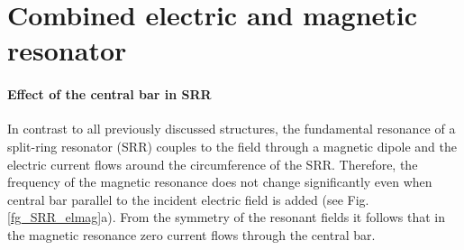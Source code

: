 \section{Combined electric and magnetic resonator} \label{section_emsrr} %
\paragraph{Effect of the central bar in SRR}%
In contrast to all previously discussed structures, the fundamental resonance of a split-ring resonator (SRR) couples to the field through a magnetic dipole and the electric current flows around the circumference of the SRR. Therefore, the frequency of the magnetic resonance does not change significantly even when central bar parallel to the incident electric field is added (see Fig. \ref{fg_SRR_elmag}a). From the symmetry of the resonant fields it follows that in the magnetic resonance zero current flows through the central bar. 

